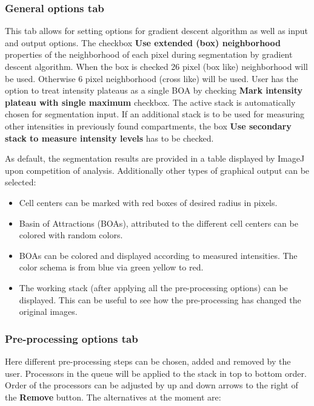 \documentclass[a4paper,12pt]{article}
\begin{document}
\subsubsection{General options tab}
This tab allows for setting options for gradient descent algorithm as well as input and output options.
The checkbox \textbf{Use extended (box) neighborhood} properties of the neighborhood of each pixel during segmentation by gradient descent algorithm. When the box is checked 26 pixel (box like) neighborhood will be used. Otherwise 6 pixel neighborhood (cross like) will be used.
User has the option to treat intensity plateaus as a single BOA by checking \textbf{Mark intensity plateau with single maximum} checkbox.
 The active
stack is automatically chosen for segmentation input. If an additional stack is to
be used for measuring other intensities in previously found compartments, the box \textbf{Use secondary stack to measure intensity levels} has to be checked.

As default, the segmentation results are provided in a table displayed by
ImageJ upon competition of analysis. Additionally other types of graphical output can be selected:

\begin{itemize}
%
\item Cell centers can be marked with red boxes of desired radius in pixels.
%
\item Basin of Attractions (BOAs), attributed to the different cell centers can be
	colored with random colors.
%
\item BOAs can be colored and displayed according to measured intensities. The color schema is from blue via green yellow to red.
%
\item The working stack (after applying all the pre-processing options) can be displayed. This can be useful to see how the
	pre-processing has changed the original images.
%
\end{itemize}

\subsubsection{Pre-processing options tab}
Here different pre-processing steps can be chosen, added and removed by the
user. Processors in the queue will be applied to the stack in top to bottom order. Order of the processors can be adjusted by up and down arrows to the right of the \textbf{Remove} button. The alternatives at the moment are:
\end{document}
